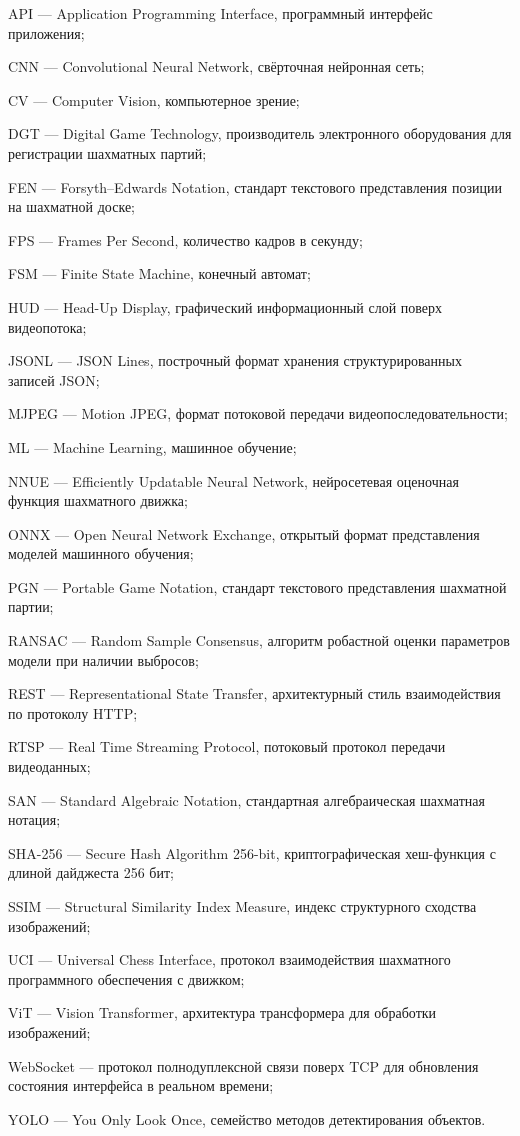 \label{sec:reduction}

API — Application Programming Interface, программный интерфейс приложения;

CNN — Convolutional Neural Network, свёрточная нейронная сеть;

CV — Computer Vision, компьютерное зрение;

DGT — Digital Game Technology, производитель электронного оборудования для регистрации шахматных партий;

FEN — Forsyth--Edwards Notation, стандарт текстового представления позиции на шахматной доске;

FPS — Frames Per Second, количество кадров в секунду;

FSM — Finite State Machine, конечный автомат;

HUD — Head-Up Display, графический информационный слой поверх видеопотока;

JSONL — JSON Lines, построчный формат хранения структурированных записей JSON;

MJPEG — Motion JPEG, формат потоковой передачи видеопоследовательности;

ML — Machine Learning, машинное обучение;

NNUE — Efficiently Updatable Neural Network, нейросетевая оценочная функция шахматного движка;

ONNX — Open Neural Network Exchange, открытый формат представления моделей машинного обучения;

PGN — Portable Game Notation, стандарт текстового представления шахматной партии;

RANSAC — Random Sample Consensus, алгоритм робастной оценки параметров модели при наличии выбросов;

REST — Representational State Transfer, архитектурный стиль взаимодействия по протоколу HTTP;

RTSP — Real Time Streaming Protocol, потоковый протокол передачи видеоданных;

SAN — Standard Algebraic Notation, стандартная алгебраическая шахматная нотация;

SHA-256 — Secure Hash Algorithm 256-bit, криптографическая хеш-функция с длиной дайджеста 256 бит;

SSIM — Structural Similarity Index Measure, индекс структурного сходства изображений;

UCI — Universal Chess Interface, протокол взаимодействия шахматного программного обеспечения с движком;

ViT — Vision Transformer, архитектура трансформера для обработки изображений;

WebSocket — протокол полнодуплексной связи поверх TCP для обновления состояния интерфейса в реальном времени;

YOLO — You Only Look Once, семейство методов детектирования объектов.
